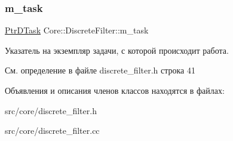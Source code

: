 \subsubsection{\texorpdfstring{m\+\_\+task}{m\_task}}
{\footnotesize\ttfamily \hyperlink{namespace_core_a9cd3f9b81303651b8d115031018f0ebf}{Ptr\+D\+Task} Core\+::\+Discrete\+Filter\+::m\+\_\+task\hspace{0.3cm}{\ttfamily [protected]}}

Указатель на экземпляр задачи, с которой происходит работа. 

См. определение в файле discrete\+\_\+filter.\+h строка 41



Объявления и описания членов классов находятся в файлах\+:\begin{DoxyCompactItemize}
\item 
src/core/discrete\+\_\+filter.\+h\item 
src/core/discrete\+\_\+filter.\+cc\end{DoxyCompactItemize}
